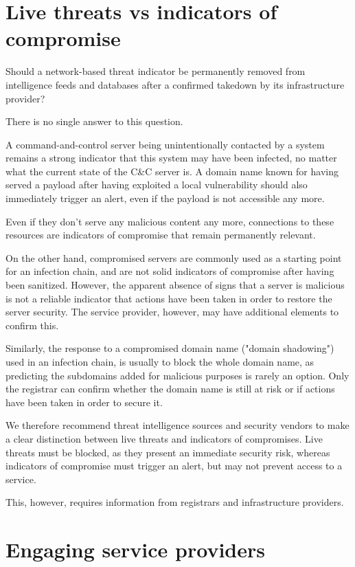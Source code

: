 \documentclass[conference]{IEEEtran}
\begin{document}
\section{Live threats vs indicators of compromise}

Should a network-based threat indicator be permanently removed from intelligence feeds and databases after a confirmed takedown by its infrastructure provider?

There is no single answer to this question.

A command-and-control server being unintentionally contacted by a system remains a strong indicator that this system may have been infected, no matter what the current state of the C\&C server is.
A domain name known for having served a payload after having exploited a local vulnerability should also immediately trigger an alert, even if the payload is not accessible any more.

Even if they don't serve any malicious content any more, connections to these resources are indicators of compromise that remain permanently relevant.

On the other hand, compromised servers are commonly used as a starting point for an infection chain, and are not solid indicators of compromise after having been sanitized. However, the apparent absence of signs that a server is malicious is not a reliable indicator that actions have been taken in order to restore the server security. The service provider, however, may have additional elements to confirm this.

Similarly, the response to a compromised domain name ("domain shadowing") used in an infection chain, is usually to block the whole domain name, as predicting the subdomains added for malicious purposes is rarely an option. Only the registrar can confirm whether the domain name is still at risk or if actions have been taken in order to secure it.

We therefore recommend threat intelligence sources and security vendors to make a clear distinction between live threats and indicators of compromises. Live threats must be blocked, as they present an immediate security risk, whereas indicators of compromise must trigger an alert, but may not prevent access to a service.

This, however, requires information from registrars and infrastructure providers.

\section{Engaging service providers}
\end{document}
